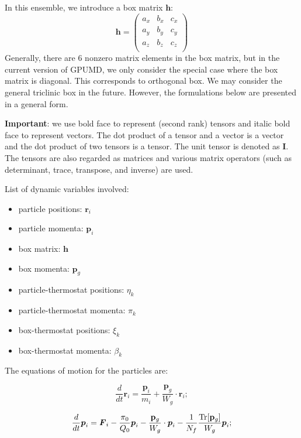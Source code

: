 \documentclass[12pt,a4paper]{report}
\newcommand{\vect}[1]{\boldsymbol{#1}}
\begin{document}
In this ensemble, we introduce a box matrix $\mathbf{h}$:
\begin{equation}
\mathbf{h} = \left(
\begin{array}{ccc}
a_{x} & b_{x} & c_{x} \\
a_{y} & b_{y} & c_{y} \\
a_{z} & b_{z} & c_{z} \\
\end{array}
\right)
\end{equation}
Generally, there are 6 nonzero matrix elements in the box matrix, but in the current version of GPUMD, we only consider the special case where the box matrix is diagonal. This corresponds to orthogonal box. We may consider the general triclinic box in the future. However, the formulations below are presented in a general form. 

\textbf{Important}: we use bold face to represent (second rank) tensors and italic bold face to represent vectors. The dot product of a  tensor and a vector is a vector and the dot product of two tensors is a tensor. The unit tensor is denoted as $\mathbf{I}$. The tensors are also regarded as matrices and various matrix operators (such as determinant, trace, transpose, and inverse) are used.

List of dynamic variables involved:
\begin{itemize}
\item particle positions: $\vect{r}_i$
\item particle momenta: $\vect{p}_i$
\item box matrix: $\mathbf{h}$
\item box momenta: $\mathbf{p}_g$
\item particle-thermostat positions: $\eta_k$
\item particle-thermostat momenta: $\pi_k$
\item box-thermostat positions: $\xi_k$
\item box-thermostat momenta: $\beta_k$
\end{itemize}

The equations of motion for the particles are:

\begin{equation}
\frac{d}{dt} \vect{r}_i = \frac{\vect{p}_i}{m_i} + \frac{\mathbf{p}_g}{W_g} \cdot \vect{r}_i;
\end{equation}

\begin{equation}
\frac{d}{dt} \vect{p}_i = \vect{F}_i - \frac{\pi_0}{Q_0} \vect{p}_i - \frac{\mathbf{p}_g}{W_g} \cdot \vect{p}_i - \frac{1}{N_f}\frac{\textmd{Tr}[\mathbf{p}_g]}{W_g}  \vect{p}_i;
\end{equation}
\end{document}
